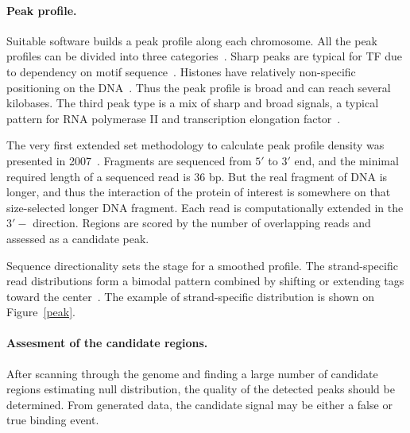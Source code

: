 \paragraph{Peak profile.}
Suitable software builds a peak profile along each chromosome. 
All the peak profiles can be divided into three categories~\cite{park2009chip}. 
Sharp peaks are typical for TF due to dependency on motif sequence~\cite{landt2012chip}. 
Histones have relatively non-specific positioning on the DNA~\cite{krig2007identification}. 
Thus the peak profile is broad and can reach several kilobases. 
The third peak type is a mix of sharp and broad signals, a typical pattern for RNA polymerase II and transcription elongation factor~\cite{squazzo2006suz12, lin2011dynamic}.


The very first extended set methodology to calculate peak profile density was presented in 2007~\cite{robertson2007genome}. 
Fragments are sequenced from $5'$ to $3'$ end, and the minimal required length of a sequenced read is 36 bp. 
But the real fragment of DNA is longer, and thus the interaction of the protein of interest is somewhere on that size-selected longer DNA fragment. 
Each read is computationally extended in the $3'-$ direction. 
Regions are scored by the number of overlapping reads and assessed as a candidate peak.



Sequence directionality sets the stage for a smoothed profile. 
The strand-specific read distributions form a bimodal pattern combined by shifting or extending tags toward the center~\cite{valouev2008genome}.
The example of strand-specific distribution is shown on Figure~\ref{peak}.



\paragraph{Assesment of the candidate regions.}
After scanning through the genome and finding a large number of candidate regions estimating null distribution, the quality of the detected peaks should be determined. 
From generated data, the candidate signal may be either a false or true binding event. 




